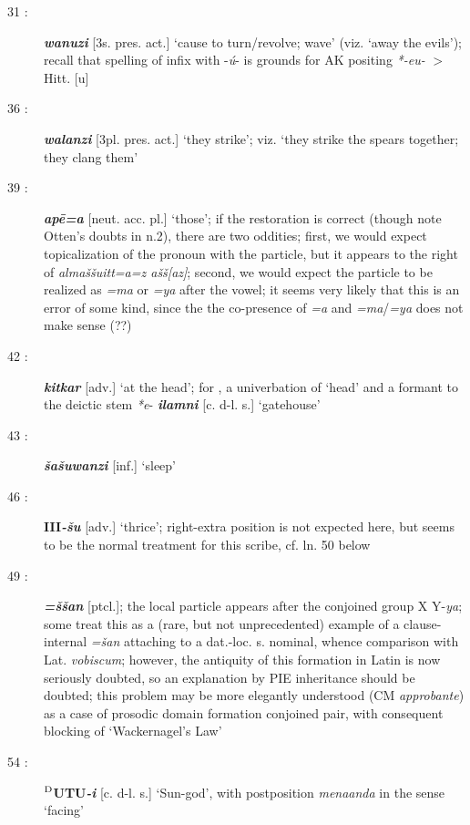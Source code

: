 \documentclass[10pt]{article}
\newcommand{\supersc}[1]{$^{\textrm{\scriptsize{#1}}}$}  	%
\newcommand{\bit}[1]{\textbf{\textit{#1}}}				%
\newcommand{\p}[1]{{\tiny[{#1}]}}					%
\newcommand{\palk}{\textroundcap{k}}						%
\newcommand{\hith}{\textsubwedge{h}}
\renewcommand{\.}[1]{\textsubdot{#1}}
\begin{document}
\begin{description}
\item[31 :] \bit{wa{\hith}nuzi} \p{3s. pres. act.} `cause to turn/revolve; wave' (viz. `away the evils'); recall that spelling of infix with -\textit{\'u}- is grounds for AK positing \textit{*-eu-} $>$ Hitt. [u]

\item[36 :] \bit{wal{\hith}anzi} \p{3pl. pres. act.} `they strike'; viz. `they strike the spears together; they clang them'

\item[39 :] \bit{ap\=e=a} \p{neut. acc. pl.} `those'; if the restoration is correct (though note Otten's doubts in n.2), there are two oddities; first, we would expect topicalization of the pronoun with the particle, but it appears to the right of \textit{{\hith}alma\v{s}\v{s}uitt=a=z {\hith}a\v{s}\v{s}[az]}; second, we would expect the particle to be realized as \textit{=ma} or \textit{=ya} after the vowel; it seems very likely that this is an error of some kind, since the the co-presence of \textit{=a} and \textit{=ma}/\textit{=ya} does not make sense (??)

\item[42 :] \bit{kitkar} \p{adv.} `at the head'; for \citet{nussbaum1986hh}, a univerbation of `head' and a formant to the deictic stem \textit{*{\palk}e}- \bit{{\hith}ilamni} \p{c. d-l. s.} `gatehouse'

\item[43 :] \bit{\v{s}a\v{s}uwanzi} \p{inf.} `sleep'

\item[46 :] \textbf{III}\bit{-\v{s}u} \p{adv.} `thrice'; right-extra position is not expected here, but seems to be the normal treatment for this scribe, cf. ln. 50 below

\item[49 :] \bit{=\v{s}\v{s}an} \p{ptcl.}; the local particle appears after the conjoined group X Y-\textit{ya}; some treat this as a (rare, but not unprecedented) example of a clause-internal \textit{=\v{s}an} attaching to a dat.-loc. s. nominal, whence comparison with Lat. \textit{vobiscum}; however, the antiquity of this formation in Latin is now seriously doubted, so an explanation by PIE inheritance should be doubted; this problem may be more elegantly understood (CM \textit{approbante}) as a case of prosodic domain formation  conjoined pair, with consequent blocking of `Wackernagel's Law'

\item[54 :] \textbf{\supersc{D}UTU}\bit{-i} \p{c. d-l. s.} `Sun-god', with postposition \textit{mena{\hith\hith}anda} in the sense `facing'


\end{description}
\end{document}

